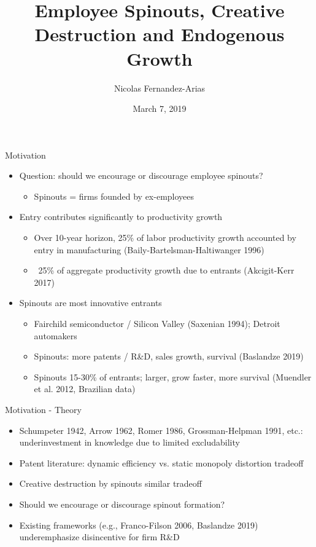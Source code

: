 \documentclass[english,usenames,dvipsnames]{beamer}
\title{Employee Spinouts, Creative Destruction and Endogenous Growth}
\author{Nicolas Fernandez-Arias}
\institute{Student Macro Workshop}
\date{March 7, 2019}
\begin{document}
\maketitle



\begin{frame}{Motivation}
\begin{itemize}
	\item Question: should we encourage or discourage employee spinouts? 
	\begin{itemize}
		\item Spinouts = firms founded by ex-employees
	\end{itemize}
	\item Entry contributes significantly to productivity growth
	\begin{itemize}
		\item Over 10-year horizon, 25\% of labor productivity growth accounted by entry in manufacturing (Baily-Bartelsman-Haltiwanger 1996)
		\item ~25\% of aggregate productivity growth due to entrants (Akcigit-Kerr 2017)
	\end{itemize}
	\item Spinouts are most innovative entrants
	\begin{itemize}
		\item Fairchild semiconductor / Silicon Valley (Saxenian 1994); Detroit automakers
		\item Spinouts: more patents / R\&D, sales growth, survival (Baslandze 2019) 
		\item Spinouts 15-30\% of entrants; larger, grow faster, more survival (Muendler et al. 2012, Brazilian data)
	\end{itemize}
\end{itemize}
\end{frame}

\begin{frame}{Motivation - Theory}
\label{theory_big_picture}
\begin{itemize}
	\item Schumpeter 1942, Arrow 1962, Romer 1986, Grossman-Helpman 1991, etc.: \alert{underinvestment} in knowledge due to \alert{limited excludability}
	\item Patent literature: dynamic efficiency vs. static monopoly distortion tradeoff
	\item Creative destruction by spinouts similar tradeoff
	\item Should we encourage or discourage spinout formation?
	\item Existing frameworks (e.g., Franco-Filson 2006, Baslandze 2019) underemphasize disincentive for firm R\&D 
\end{itemize}
\end{frame}
\end{document}
